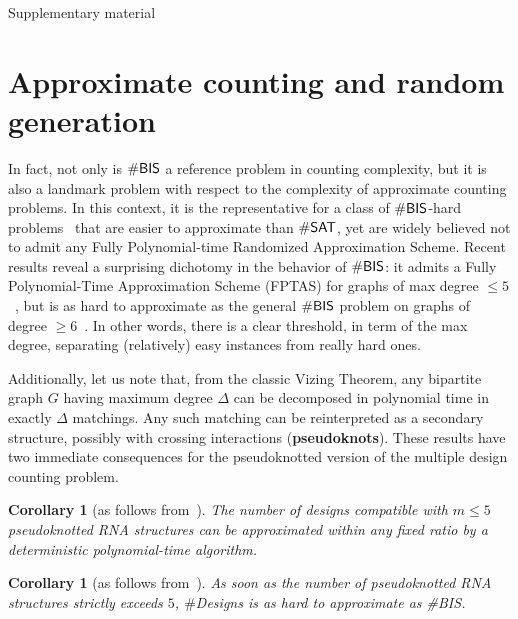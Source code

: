 \documentclass{bioinfo}
\newtheorem{corollary}[theorem]{Corollary}
\newcommand{\Def}[1]{{\bfseries #1}}
\newcommand{\NumDesign}{\ensuremath{\#}{\sf Designs}\xspace}
\begin{document}

%
%
%
%
%
%
%



\newpage
\onecolumn

\appendix
{\centering {}Supplementary material\\%
}
\section{Approximate counting and random generation}
In fact, not only is $\#{\sf BIS}$ a reference problem in counting complexity, but it is also a landmark problem with respect to the complexity of approximate counting problems. In this context, it is the representative for a class of $\#{\sf BIS}$-hard problems~\citep{Bulatov2013} that are easier to approximate than $\# {\sf SAT}$, yet are widely believed not to admit any Fully Polynomial-time Randomized Approximation Scheme. Recent results reveal a surprising dichotomy in the behavior of $\#{\sf BIS}$: it admits a Fully Polynomial-Time Approximation Scheme (FPTAS) for graphs of max degree $\le 5$~\citep{Weitz2006}, but is as hard to approximate as the general $\#{\sf BIS}$ problem on graphs of degree $\ge 6$~\citep{Cai2016}. In other words, there is a clear threshold, in term of the max degree, separating (relatively) easy instances from really hard ones.

Additionally, let us note that, from the classic Vizing Theorem, any bipartite graph $G$ having maximum degree $\Delta$ can be decomposed in polynomial time in exactly $\Delta$ matchings. Any such matching can be reinterpreted as a secondary structure, possibly with crossing interactions (\Def{pseudoknots}). These results have two immediate consequences for the pseudoknotted version of the multiple design counting problem.
\begin{corollary}[as follows from~\citep{Weitz2006}]The number of designs compatible with $m\le 5$ pseudoknotted RNA structures can be approximated within any fixed ratio by a deterministic polynomial-time algorithm.
\end{corollary}
\begin{corollary}[as follows from~\citep{Cai2016}]
  As soon as the number of pseudoknotted RNA structures strictly exceeds $5$, \NumDesign is as hard to approximate as {\#{\sf BIS}}.
\end{corollary}
\end{document}
